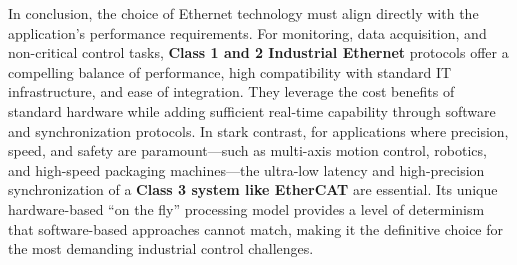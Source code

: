 \documentclass[a4paper, 12pt]{book} %
\begin{document}
In conclusion, the choice of Ethernet technology must align directly
with the application's performance requirements. For monitoring, data
acquisition, and non-critical control tasks, \textbf{Class 1 and 2
Industrial Ethernet} protocols offer a compelling balance of
performance, high compatibility with standard IT infrastructure, and
ease of integration. They leverage the cost benefits of standard
hardware while adding sufficient real-time capability through software
and synchronization protocols. In stark contrast, for applications where
precision, speed, and safety are paramount---such as multi-axis motion
control, robotics, and high-speed packaging machines---the ultra-low
latency and high-precision synchronization of a \textbf{Class 3 system
like EtherCAT} are essential. Its unique hardware-based ``on the fly''
processing model provides a level of determinism that software-based
approaches cannot match, making it the definitive choice for the most
demanding industrial control challenges.
\end{document}
